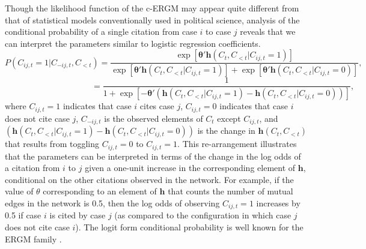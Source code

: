 \documentclass{cup-pan}
\begin{document}
Though the likelihood function of the c-ERGM may appear quite different from that of statistical models conventionally used in political science, analysis of the conditional probability of a single citation from case $i$ to case $j$ reveals that we can interpret the parameters similar to logistic regression coefficients. $$ P(C_{ij,t} = 1 | C_{-ij,t}, C_{ < t}) = \frac{\exp \left[ {\bm{\theta}'\bm{h}(C_{t},C_{<t}| C_{ij,t} = 1) } \right]}{ \exp \left[ {\bm{\theta}'\bm{h}(C_{t},C_{<t}| C_{ij,t} = 1) } \right] + \exp \left[ {\bm{\theta}'\bm{h}(C_{t},C_{<t}| C_{ij,t} = 0) } \right]}, $$ $$ \text{~~~~~~~~~~~~~~~~~~~~~~~~~~~~~~~} = \frac{1}{ 1 + \exp \left[ - {\bm{\theta}'\left(\bm{h}(C_{t},C_{<t}| C_{ij,t} = 1) - \bm{h}(C_{t},C_{<t}| C_{ij,t} = 0)\right)} \right]}, $$
where $C_{ij,t} = 1$ indicates that case $i$ cites case $j$, $C_{ij,t} = 0$ indicates that case $i$ does not cite case $j$, $C_{-ij,t}$ is the observed elements of $C_{t}$ except $C_{ij,t}$, and $\left(\bm{h}(C_{t},C_{<t}| C_{ij,t} = 1) - \bm{h}(C_{t},C_{<t}| C_{ij,t} = 0)\right)$ is the change in $\bm{h}(C_{t},C_{<t})$ that results from toggling $C_{ij,t} = 0$ to $C_{ij,t} = 1$. This re-arrangement illustrates that the parameters can be interpreted in terms of the change in the log odds of a citation from $i$ to $j$ given a one-unit increase in the corresponding element of $\bm{h}$, conditional on the other citations observed in the network. For example, if the value of $\theta$ corresponding to an element of $\bm{h}$ that counts the number of mutual edges in the network is 0.5, then the log odds of observing $C_{ij,t} = 1$ increases by 0.5 if case $i$ is cited by case $j$ (as compared to the configuration in which case $j$ does not cite case $i$). The logit form conditional probability is well known for the ERGM family \citep{goodreau2009birds}. 
\end{document}
